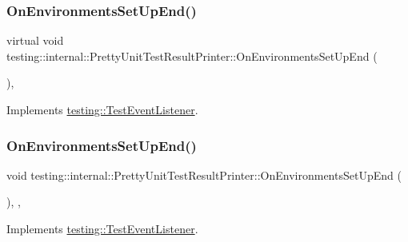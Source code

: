 \subsubsection{\texorpdfstring{OnEnvironmentsSetUpEnd()}{OnEnvironmentsSetUpEnd()}\hspace{0.1cm}{\footnotesize\ttfamily [1/3]}}
{\footnotesize\ttfamily virtual void testing\+::internal\+::\+Pretty\+Unit\+Test\+Result\+Printer\+::\+On\+Environments\+Set\+Up\+End (\begin{DoxyParamCaption}\item[{const \mbox{\hyperlink{classtesting_1_1_unit_test}{Unit\+Test}} \&}]{ }\end{DoxyParamCaption})\hspace{0.3cm}{\ttfamily [inline]}, {\ttfamily [virtual]}}



Implements \mbox{\hyperlink{classtesting_1_1_test_event_listener_aaa1021d75f5dbf3f05c829c1cc520341}{testing\+::\+Test\+Event\+Listener}}.

\mbox{\label{classtesting_1_1internal_1_1_pretty_unit_test_result_printer_a9853207ad1aedfe89c72f8047ac3541a}} 
\subsubsection{\texorpdfstring{OnEnvironmentsSetUpEnd()}{OnEnvironmentsSetUpEnd()}\hspace{0.1cm}{\footnotesize\ttfamily [2/3]}}
{\footnotesize\ttfamily void testing\+::internal\+::\+Pretty\+Unit\+Test\+Result\+Printer\+::\+On\+Environments\+Set\+Up\+End (\begin{DoxyParamCaption}\item[{const \mbox{\hyperlink{classtesting_1_1_unit_test}{Unit\+Test}} \&}]{ }\end{DoxyParamCaption})\hspace{0.3cm}{\ttfamily [inline]}, {\ttfamily [override]}, {\ttfamily [virtual]}}



Implements \mbox{\hyperlink{classtesting_1_1_test_event_listener_aaa1021d75f5dbf3f05c829c1cc520341}{testing\+::\+Test\+Event\+Listener}}.

